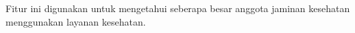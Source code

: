 Fitur ini digunakan untuk mengetahui seberapa besar anggota jaminan kesehatan menggunakan layanan kesehatan.
